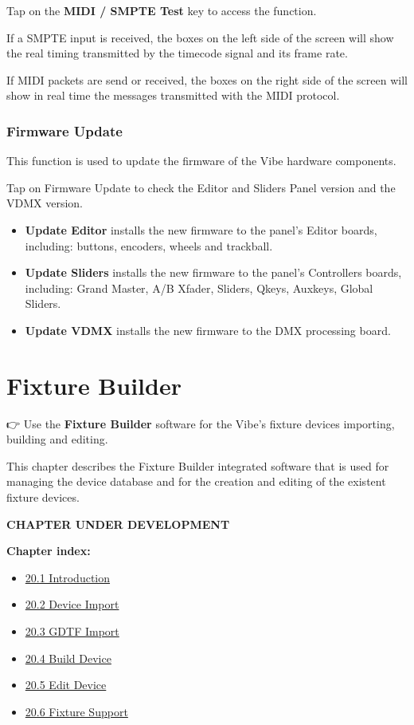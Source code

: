 \documentclass[
]{article}
\providecommand{\tightlist}{%
  \setlength{\itemsep}{0pt}\setlength{\parskip}{0pt}}
\begin{document}
Tap on the \textbf{MIDI / SMPTE Test} key to access the function.

If a SMPTE input is received, the boxes on the left side of the screen will show the real timing transmitted by the timecode signal and its frame rate.

If MIDI packets are send or received, the boxes on the right side of the screen will show in real time the messages transmitted with the MIDI protocol.

\hypertarget{firmware-update}{%
\subsubsection{Firmware Update}\label{firmware-update}}

This function is used to update the firmware of the Vibe hardware components.

Tap on Firmware Update to check the Editor and Sliders Panel version and the VDMX version.

\begin{itemize}
\item
  \textbf{Update Editor} installs the new firmware to the panel's Editor boards, including: buttons, encoders, wheels and trackball.
\item
  \textbf{Update Sliders} installs the new firmware to the panel's Controllers boards, including: Grand Master, A/B Xfader, Sliders, Qkeys, Auxkeys, Global Sliders.
\item
  \textbf{Update VDMX} installs the new firmware to the DMX processing board.
\end{itemize}

\hypertarget{fixture-builder}{%
\section{Fixture Builder}\label{fixture-builder}}

👉 Use the \textbf{Fixture Builder} software for the Vibe's fixture devices importing, building and editing.

This chapter describes the Fixture Builder integrated software that is used for managing the device database and for the creation and editing of the existent fixture devices.

{\textbf{CHAPTER UNDER DEVELOPMENT}}

\textbf{Chapter index:}

\begin{itemize}
\tightlist
\item
  \protect\hyperlink{Introduction-20.1}{20.1 Introduction}
\item
  \protect\hyperlink{Device-Import-20.2}{20.2 Device Import}
\item
  \protect\hyperlink{GDTF-Import-20.3}{20.3 GDTF Import}
\item
  \protect\hyperlink{Build-Device-20.4}{20.4 Build Device}
\item
  \protect\hyperlink{Edit-Device-20.5}{20.5 Edit Device}
\item
  \protect\hyperlink{Fixture-Support-20.6}{20.6 Fixture Support}
\end{itemize}
\end{document}
